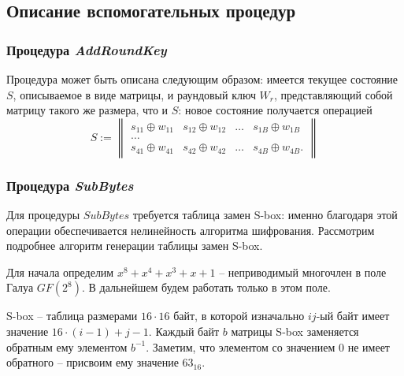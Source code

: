\subsection{Описание вспомогательных процедур}

\subsubsection{Процедура \textit{AddRoundKey}} \label{AddRoundKey}

    Процедура может быть описана следующим образом: имеется текущее состояние $S$, описываемое в виде матрицы, и
    раундовый ключ $W_{r}$, представляющий собой матрицу такого же размера, что и $S$: новое состояние получается операцией
    \begin{equation}
        S :=
        \begin{Vmatrix}
            s_{11} \oplus w_{11} & s_{12} \oplus w_{12} & \dots & s_{1B} \oplus w_{1B} \\
            \dots \\
            s_{41} \oplus w_{41} & s_{42} \oplus w_{42} & \dots & s_{4B} \oplus w_{4B}.
        \end{Vmatrix}
    \end{equation}

\subsubsection{Процедура \textit{SubBytes}} \label{SubBytes}

    Для процедуры $SubBytes$ требуется таблица замен S-box: именно благодаря этой операции обеспечивается
    нелинейность алгоритма шифрования. Рассмотрим подробнее алгоритм генерации таблицы замен S-box.

    Для начала определим $x^8 + x^4 + x^3 + x + 1$ -- неприводимый многочлен в поле Галуа $GF(2^8)$.
    В дальнейшем будем работать только в этом поле.

    S-box -- таблица размерами $16 \cdot 16$ байт, в которой изначально $ij$-ый байт имеет значение $16 \cdot (i - 1) + j - 1$.
    Каждый байт $b$ матрицы S-box заменяется обратным ему элементом $b^{-1}$. Заметим, что элементом
    со значением 0 не имеет обратного -- присвоим ему значение $63_{16}$.

